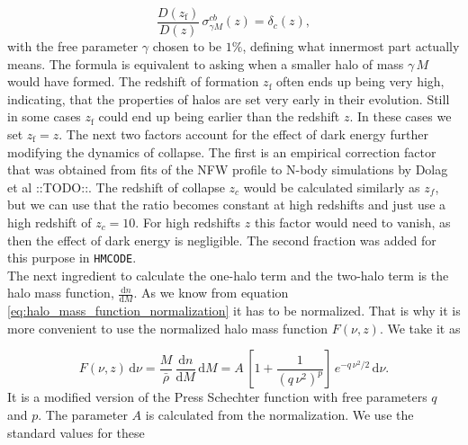 \documentclass[oneside]{book}
\newcommand*{\rd}{\mathrm{d}}
\newcommand*{\marktodo}{{\color{mmcol} ::TODO::}\xspace}
\newcommand*{\hmcode}{\texttt{HMCODE}\xspace}
\begin{document}
\begin{equation}
    \frac{D(z_\mathrm{f})}{D(z)}\,\sigma^{cb}_{\gamma M }(z) = \delta_c(z),
\end{equation}
with the free parameter $\gamma$ chosen to be $1\%$, defining what innermost part actually means. The formula is equivalent to asking when a smaller halo of mass $\gamma\,M$ would have formed. The redshift of formation $z_\mathrm{f}$ often ends up being very high, indicating, that the properties of halos are set very early in their evolution. Still in some cases $z_\mathrm{f}$ could end up being earlier than the redshift $z$. In these cases we set $z_\mathrm{f}=z$. The next two factors account for the effect of dark energy further modifying the dynamics of collapse. The first is an empirical correction factor that was obtained from fits of the NFW profile to N-body simulations by Dolag et al \marktodo. The redshift of collapse $z_c$ would be calculated similarly as $z_f$, but we can use that the ratio becomes constant at high redshifts and just use a high redshift of $z_c=10$. For high redshifts $z$ this factor would need to vanish, as then the effect of dark energy is negligible. The second fraction was added for this purpose in \hmcode.\\
The next ingredient to calculate the one-halo term and the two-halo term is the halo mass function, $\frac{\rd n}{\rd M}$. As we know from equation \ref{eq:halo_mass_function_normalization} it has to be normalized.  That is why it is more convenient to use the normalized halo mass function $F(\nu,z)$. We take it as

\begin{equation}
    F(\nu,z) \,\rd \nu= \frac{M}{\bar{\rho}}\, \frac{\rd n}{\rd M} \, \rd M = A\,\left[1+\frac{1}{\left(q\,\nu^2\right)^p}\right]\,e^{-q\,\nu^2/2} \,\rd \nu.
\end{equation}
It is a modified version of the Press Schechter function with free parameters $q$ and $p$. The parameter $A$ is calculated from the normalization. We use the standard values for these 
\end{document}
